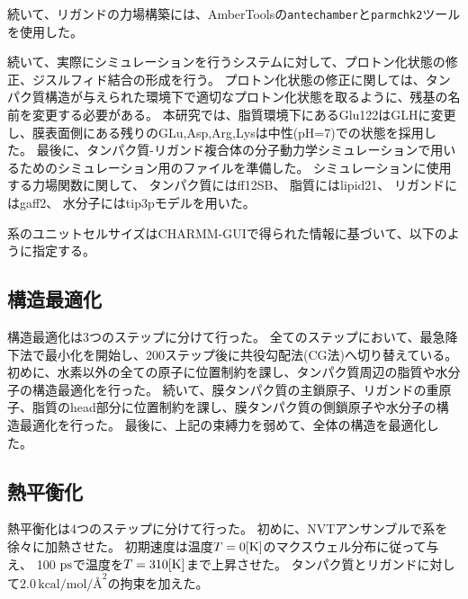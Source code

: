 続いて、リガンドの力場構築には、AmberToolsの\texttt{antechamber}と\texttt{parmchk2}ツールを使用した。

続いて、実際にシミュレーションを行うシステムに対して、プロトン化状態の修正、ジスルフィド結合の形成を行う。
プロトン化状態の修正に関しては、タンパク質構造が与えられた環境下で適切なプロトン化状態を取るように、残基の名前を変更する必要がある。
本研究では、脂質環境下にあるGlu122はGLHに変更し、膜表面側にある残りのGLu,Asp,Arg,Lysは中性(pH=7)での状態を採用した。
最後に、タンパク質-リガンド複合体の分子動力学シミュレーションで用いるためのシミュレーション用のファイルを準備した。
シミュレーションに使用する力場関数に関して、
タンパク質にはff12SB、
脂質にはlipid21、
リガンドにはgaff2、
水分子にはtip3pモデルを用いた。

系のユニットセルサイズはCHARMM-GUIで得られた情報に基づいて、以下のように指定する。
\begin{table}[!ht]
  \centering
  \caption{シミュレーションに用いた系の大きさ}
  \label{tab:system_size}
\end{table}


\subsection{構造最適化}
構造最適化は3つのステップに分けて行った。
全てのステップにおいて、最急降下法で最小化を開始し、200ステップ後に共役勾配法(CG法)へ切り替えている。
初めに、水素以外の全ての原子に位置制約を課し、タンパク質周辺の脂質や水分子の構造最適化を行った。
続いて、膜タンパク質の主鎖原子、リガンドの重原子、脂質のhead部分に位置制約を課し、膜タンパク質の側鎖原子や水分子の構造最適化を行った。
最後に、上記の束縛力を弱めて、全体の構造を最適化した。

\subsection{熱平衡化}
熱平衡化は4つのステップに分けて行った。
初めに、NVTアンサンブルで系を徐々に加熱させた。
初期速度は温度$T = 0 \rm{[K]}$のマクスウェル分布に従って与え、 
100 $\rm{ps}$で温度を$T = 310 \rm{[K]}$まで上昇させた。
タンパク質とリガンドに対して$2.0 \, \text{kcal/mol/\AA}^2$の拘束を加えた。

